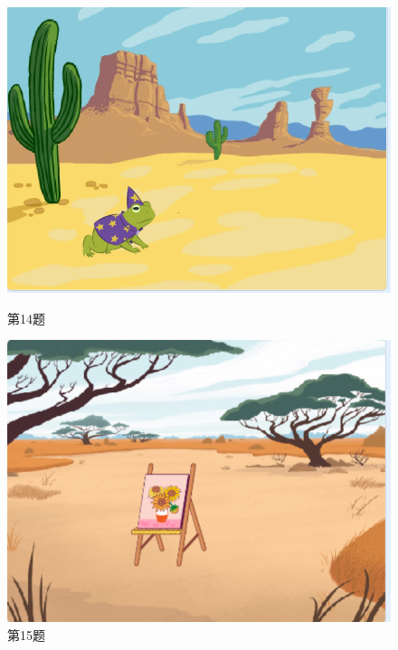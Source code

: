 \documentclass[10pt, a4paper]{article}
\begin{document}
\begin{enumerate}
\begin{figure}[htbp]
\begin{minipage}[t]{.38\textwidth}
\begin{minipage}[t]{.4\textwidth}
                \end{minipage}
                \begin{minipage}[t]{.58\textwidth}
                    \centering
                    \includegraphics[width=\textwidth]{14-2.png}
                \end{minipage}
                \caption*{第14题}
            \end{minipage}
            \begin{minipage}[t]{.23\textwidth}
                \centering
                \includegraphics[width=\textwidth]{15.png}
                \caption*{第15题}
            \end{minipage}
        \end{figure}
    

\end{enumerate}
\end{document}
